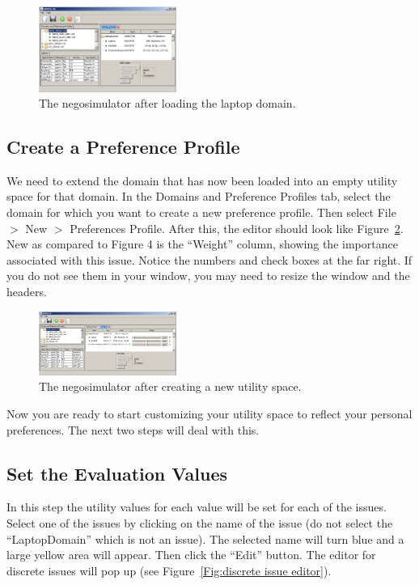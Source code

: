 \documentclass[]{article}
\begin{document}
\begin{figure}[htb]
	\centering
	\includegraphics[width=0.4\textwidth]{media/image7.png}
\caption{The negosimulator after loading the laptop domain.}\label{Fig:negosimulator domain loaded}
\end{figure}

\subsection{Create a Preference Profile}
We need to extend the domain that has now been loaded into an empty utility space for that domain. In the Domains and Preference Profiles tab, select the domain for which you want to create a new preference profile. Then select File $>$ New $>$ Preferences Profile. After this, the editor should look like Figure~\ref{Fig:negosimulator utility space created}. New as compared to Figure 4 is the ``Weight'' column, showing the importance associated with this issue. Notice the numbers and check boxes at the far right. If you do not see them in your window, you may need to resize the window and the headers.

\begin{figure}[htb]
	\centering
	\includegraphics[width=0.4\textwidth]{media/image8.png}
\caption{The negosimulator after creating a new utility space.}\label{Fig:negosimulator utility space created}
\end{figure}

Now you are ready to start customizing your utility space to reflect your personal preferences. The next two steps will deal with this.

\subsection{Set the Evaluation Values}
In this step the utility values for each value will be set for each of the issues. Select one of the issues by clicking on the name of the issue (do not select the ``LaptopDomain'' which is not an issue). The selected name will turn blue and a large yellow area will appear. Then click the ``Edit'' button. The editor for discrete issues will pop up (see Figure~\ref{Fig:discrete issue editor}).
\end{document}
